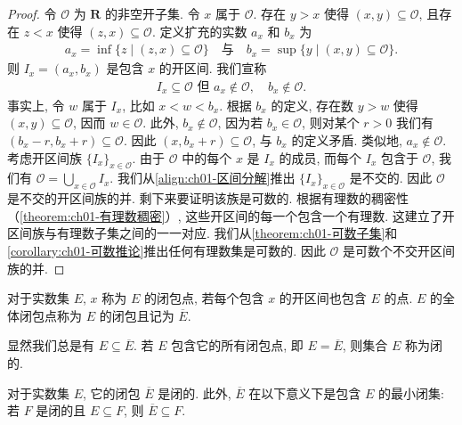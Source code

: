 \documentclass[../../main.tex]{subfiles}
\begin{document}
\begin{proof}
令 $\mathcal{O}$ 为 $\mathbf{R}$ 的非空开子集. 令 $x$ 属于 $\mathcal{O}$. 存在 $y>x$ 使得 $(x,y)\subseteq\mathcal{O}$, 且存在 $z<x$ 使得 $(z,x)\subseteq\mathcal{O}$. 定义扩充的实数 $a_{x}$ 和 $b_{x}$ 为
\begin{align*}
a_{x}=\inf\{z\mid (z,x)\subseteq\mathcal{O}\}\quad\text{与}\quad b_{x}=\sup\{y\mid (x,y)\subseteq\mathcal{O}\}.
\end{align*}
则 $I_{x}=(a_{x},b_{x})$ 是包含 $x$ 的开区间. 我们宣称
\begin{align}
I_{x}\subseteq\mathcal{O}\text{ 但 }a_{x}\notin\mathcal{O},\quad b_{x}\notin\mathcal{O}.\label{align:ch01-区间分解}
\end{align}
事实上, 令 $w$ 属于 $I_{x}$, 比如 $x<w<b_{x}$. 根据 $b_{x}$ 的定义, 存在数 $y>w$ 使得 $(x,y)\subseteq\mathcal{O}$, 因而 $w\in\mathcal{O}$. 此外, $b_{x}\notin\mathcal{O}$, 因为若 $b_{x}\in\mathcal{O}$, 则对某个 $r>0$ 我们有 $(b_{x}-r,b_{x}+r)\subseteq\mathcal{O}$. 因此 $(x,b_{x}+r)\subseteq\mathcal{O}$, 与 $b_{x}$ 的定义矛盾. 类似地, $a_{x}\notin\mathcal{O}$. 考虑开区间族 $\{I_{x}\}_{x\in\mathcal{O}}$. 由于 $\mathcal{O}$ 中的每个 $x$ 是 $I_{x}$ 的成员, 而每个 $I_{x}$ 包含于 $\mathcal{O}$, 我们有 $\mathcal{O}=\bigcup_{x\in\mathcal{O}}I_{x}$. 我们从\eqref{align:ch01-区间分解}推出 $\{I_{x}\}_{x\in\mathcal{O}}$ 是不交的. 因此 $\mathcal{O}$ 是不交的开区间族的并. 剩下来要证明该族是可数的. 根据有理数的稠密性（\cref{theorem:ch01-有理数稠密}）, 这些开区间的每一个包含一个有理数. 这建立了开区间族与有理数子集之间的一一对应. 我们从\cref{theorem:ch01-可数子集}和\cref{corollary:ch01-可数推论}推出任何有理数集是可数的. 因此 $\mathcal{O}$ 是可数个不交开区间族的并.
\end{proof}

\begin{definition}[闭包点、闭包、闭集]\label{definition:ch01-闭包闭集}
对于实数集 $E$, $x$ 称为 $E$ 的闭包点, 若每个包含 $x$ 的开区间也包含 $E$ 的点. $E$ 的全体闭包点称为 $E$ 的闭包且记为 $\overline{E}$.

显然我们总是有 $E\subseteq\overline{E}$. 若 $E$ 包含它的所有闭包点, 即 $E=\overline{E}$, 则集合 $E$ 称为闭的.
\end{definition}

\begin{proposition}\label{proposition:ch01-闭包性质}
对于实数集 $E$, 它的闭包 $\overline{E}$ 是闭的. 此外, $\overline{E}$ 在以下意义下是包含 $E$ 的最小闭集: 若 $F$ 是闭的且 $E\subseteq F$, 则 $\overline{E}\subseteq F$.
\end{proposition}
\end{document}
